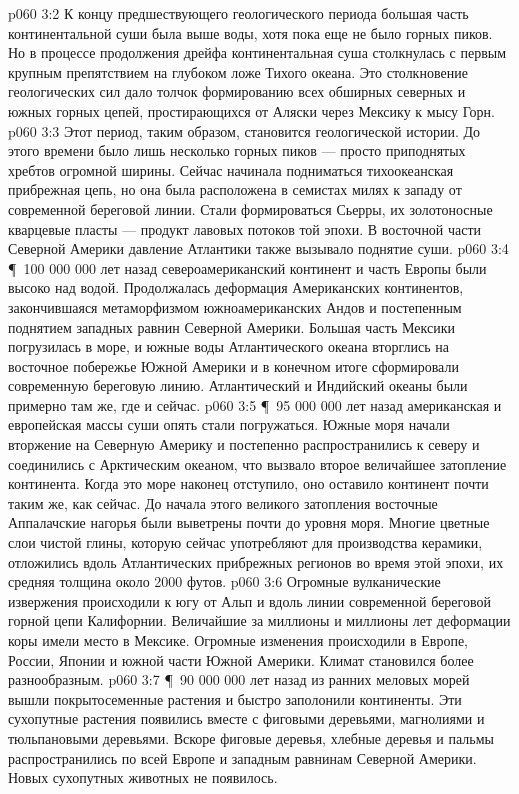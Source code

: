 \vs p060 3:2 К концу предшествующего геологического периода большая часть континентальной суши была выше воды, хотя пока еще не было горных пиков. Но в процессе продолжения дрейфа континентальная суша столкнулась с первым крупным препятствием на глубоком ложе Тихого океана. Это столкновение геологических сил дало толчок формированию всех обширных северных и южных горных цепей, простирающихся от Аляски через Мексику к мысу Горн.
\vs p060 3:3 Этот период, таким образом, становится  геологической истории. До этого времени было лишь несколько горных пиков --- просто приподнятых хребтов огромной ширины. Сейчас начинала подниматься тихоокеанская прибрежная цепь, но она была расположена в семистах милях к западу от современной береговой линии. Стали формироваться Сьерры, их золотоносные кварцевые пласты --- продукт лавовых потоков той эпохи. В восточной части Северной Америки давление Атлантики также вызывало поднятие суши.
\vs p060 3:4 \P\ 100 000 000 лет назад североамериканский континент и часть Европы были высоко над водой. Продолжалась деформация Американских континентов, закончившаяся метаморфизмом южноамериканских Андов и постепенным поднятием западных равнин Северной Америки. Большая часть Мексики погрузилась в море, и южные воды Атлантического океана вторглись на восточное побережье Южной Америки и в конечном итоге сформировали современную береговую линию. Атлантический и Индийский океаны были примерно там же, где и сейчас.
\vs p060 3:5 \P\ 95 000 000 лет назад американская и европейская массы суши опять стали погружаться. Южные моря начали вторжение на Северную Америку и постепенно распространились к северу и соединились с Арктическим океаном, что вызвало второе величайшее затопление континента. Когда это море наконец отступило, оно оставило континент почти таким же, как сейчас. До начала этого великого затопления восточные Аппалачские нагорья были выветрены почти до уровня моря. Многие цветные слои чистой глины, которую сейчас употребляют для производства керамики, отложились вдоль Атлантических прибрежных регионов во время этой эпохи, их средняя толщина около 2000 футов.
\vs p060 3:6 Огромные вулканические извержения происходили к югу от Альп и вдоль линии современной береговой горной цепи Калифорнии. Величайшие за миллионы и миллионы лет деформации коры имели место в Мексике. Огромные изменения происходили в Европе, России, Японии и южной части Южной Америки. Климат становился более разнообразным.
\vs p060 3:7 \P\ 90 000 000 лет назад из ранних меловых морей вышли покрытосеменные растения и быстро заполонили континенты. Эти сухопутные растения  появились вместе с фиговыми деревьями, магнолиями и тюльпановыми деревьями. Вскоре фиговые деревья, хлебные деревья и пальмы распространились по всей Европе и западным равнинам Северной Америки. Новых сухопутных животных не появилось.
